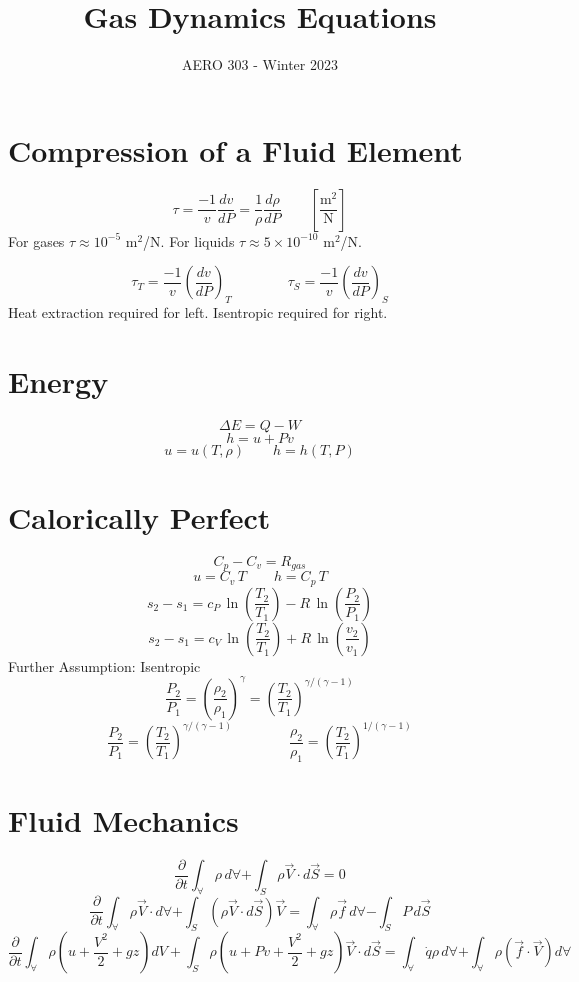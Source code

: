 \documentclass{article}
\title{Gas Dynamics Equations}
\date{AERO 303 - Winter 2023}
\begin{document}
\maketitle
\tableofcontents

\section{Compression of a Fluid Element}
\[ \tau = \frac{-1}{v} \frac{dv}{dP} = \frac{1}{\rho} \frac{d\rho}{dP} \qquad \left[ \frac{\text{m}^2}{\text{N}} \right] \] %
For gases $\tau \approx 10^{-5}$ m$^2$/N. For liquids $ \tau \approx 5 \times 10^{-10}$  m$^2$/N. 

\[ \tau_T = \frac{-1}{v} \left( \frac{dv}{dP} \right)_T \qquad\qquad \tau_S = \frac{-1}{v} \left( \frac{dv}{dP} \right)_S \] %
Heat extraction required for left. Isentropic required for right. 

\section{Energy}
\[ \Delta E = Q - W \]
\[ h = u + Pv \]
\[ u = u(T, \rho) \qquad h = h(T, P) \]

\section{Calorically Perfect}
\[ C_p - C_v = R_{gas} \]
\[ u = C_v\,T \qquad h = C_p\,T \]
\[ s_2 - s_1 = c_P\, \ln \left( \frac{T_2}{T_1} \right) - R\, \ln \left(\frac{P_2}{P_1} \right) \]
\[ s_2 - s_1 = c_V\, \ln \left( \frac{T_2}{T_1} \right) + R\, \ln \left(\frac{v_2}{v_1} \right) \]
Further Assumption: Isentropic
\[ \frac{P_2}{P_1} = \left( \frac{\rho_2}{\rho_1} \right)^\gamma = \left( \frac{T_2}{T_1} \right)^{\gamma/(\gamma-1)} \]
\[ \frac{P_2}{P_1} = \left( \frac{T_2}{T_1} \right)^{\gamma / (\gamma-1)} \qquad\qquad \frac{\rho_2}{\rho_1} = \left( \frac{T_2}{T_1} \right)^{1 / (\gamma-1)} \]

\section{Fluid Mechanics}
\[ \frac{\partial}{\partial t} \int_\forall \rho \, d\forall + \int_S \rho \vec{V} \cdot d\vec{S} = 0 \tag{Continuity} \]
\[ \frac{\partial}{\partial t} \int_\forall \rho \vec{V} \cdot d\forall + \int_S (\rho \vec{V} \cdot d\vec{S}) \vec{V} = \int_\forall \rho \vec{f} \, d\forall - \int_S P \, d\vec{S} \tag{Momentum} \]
\[ \frac{\partial}{\partial t} \int_\forall \rho (u + \frac{V^2}{2} + gz) dV + \int_S \rho (u + Pv + \frac{V^2}{2} + gz) \vec{V} \cdot d\vec{S} = \int_\forall \dot{q} \rho \, d\forall + \int_\forall \rho(\vec{f}\cdot\vec{V}) d\forall \tag{Energy} \]
\end{document}
